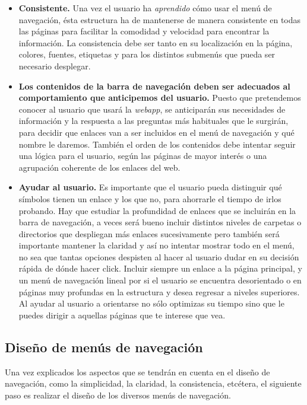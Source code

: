 \documentclass[a4paper,oneside,11pt]{book}
\begin{document}
		\begin{itemize}
			\item \textbf{Consistente.} Una vez el usuario ha \textit{aprendido} cómo usar el menú de navegación, ésta estructura ha de mantenerse de manera consistente en todas las páginas para facilitar la comodidad y velocidad para encontrar la información.
			La consistencia debe ser tanto en su localización en la página, colores, fuentes, etiquetas y para los distintos submenús que pueda ser necesario desplegar.
			\item  \textbf{Los contenidos de la barra de navegación deben ser adecuados al comportamiento que anticipemos del usuario.}	Puesto que pretendemos conocer al usuario que usará la \textit{webapp}, se anticiparán sus necesidades de información y la respuesta a las preguntas más habituales que le surgirán, para decidir que enlaces van a ser incluidos en el menú de navegación y qué nombre le daremos.
			También el orden de los contenidos debe intentar seguir una lógica para el usuario, según las páginas de mayor interés o una agrupación coherente de los enlaces del web.
			\item \textbf{Ayudar al usuario.} Es importante que el usuario pueda distinguir qué símbolos tienen un enlace y los que no, para ahorrarle el tiempo de irlos probando.
			Hay que estudiar la profundidad de enlaces que se incluirán en la barra de navegación, a veces será bueno incluir distintos niveles de carpetas o directorios que despliegan más enlaces sucesivamente pero también será importante mantener la claridad y así no intentar mostrar todo en el menú, no sea que tantas opciones despisten al hacer al usuario dudar en su decisión rápida de dónde hacer click. Incluir siempre un enlace a la página principal, y un menú de navegación lineal por si el usuario se encuentra desorientado o en páginas muy profundas en la estructura y desea regresar a niveles superiores.
			Al ayudar al usuario a orientarse no sólo optimizas su tiempo sino que le puedes dirigir a aquellas páginas que te interese que vea.
		\end{itemize}
		
	
	
	\subsection{Diseño de menús de navegación} %
	\label{sub:nav_diseno_de_menus_de_navegacion}

		Una vez explicados los aspectos que se tendrán en cuenta en el diseño de navegación, como la simplicidad, la claridad, la consistencia, etcétera, el siguiente paso es realizar el diseño de los diversos menús de navegación.
		
\end{document}
